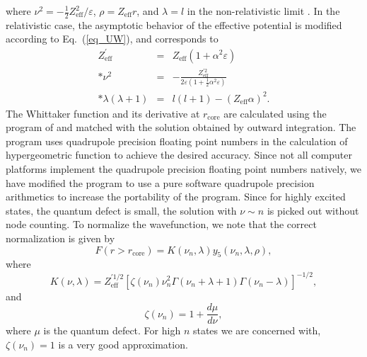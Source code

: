 where $\nu^2 = -\frac{1}{2}Z_\mathrm{eff}^2/\varepsilon$, $\rho =
Z_\mathrm{eff}r$, and $\lambda = l$ in the non-relativistic limit
\cite{seaton:1958a}. In the relativistic case, the asymptotic behavior of the
effective potential is modified according to Eq.~(\ref{eq_UW}), and corresponds
to 
\begin{eqnarray}
Z_\mathrm{eff}^\prime &=& Z_\mathrm{eff}(1+\alpha^2\varepsilon) \nonumber\\*
\nu^2 &=& -\frac{Z_\mathrm{eff}^{\prime 2}}{2\varepsilon
\left(1+\frac{1}{2}\alpha^2\varepsilon\right)} \nonumber\\*
\lambda(\lambda+1) &=& l(l+1) - (Z_\mathrm{eff}\alpha)^2 .
\end{eqnarray}
The Whittaker function and its derivative at $r_\mathrm{core}$ are calculated
using the program of \citet{thompson:1985a} and matched with the solution
obtained by outward integration. The program \cite{thompson:1985a,
thompson:2004a} uses quadrupole precision floating point numbers in the
calculation of  hypergeometric function to achieve the desired accuracy. Since
not all computer platforms implement the quadrupole precision floating point
numbers natively, we have modified the program to use a pure software quadrupole
precision arithmetics to increase the portability of the program. Since for
highly excited states, the quantum defect is small, the solution with $\nu \sim
n$ is picked out without node counting. To normalize the wavefunction, we note
that the correct normalization is given by
\cite{seaton:1958a}
\begin{equation}
\label{eq_norm}
F(r > r_\mathrm{core}) = K(\nu_n, \lambda)y_5(\nu_n, \lambda, \rho),
\end{equation}
where 
\begin{equation}
K(\nu,\lambda) =
Z_\mathrm{eff}^{\prime 1/2}\left[\zeta(\nu_n)\nu_n^2\Gamma(\nu_n+\lambda+1)
\Gamma(\nu_n-\lambda)\right]^{-1/2}, 
\end{equation}
and 
\begin{equation}
\zeta(\nu_n) = 1 + \frac{d\mu}{d\nu},
\end{equation}
where $\mu$ is the quantum defect. For high $n$ states we are concerned with,
$\zeta(\nu_n) = 1$ is a very good approximation.

